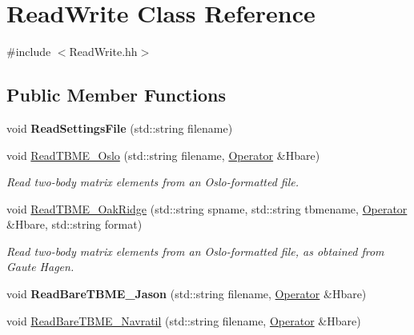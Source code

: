 \hypertarget{classReadWrite}{}\section{Read\+Write Class Reference}
\label{classReadWrite}


{\ttfamily \#include $<$Read\+Write.\+hh$>$}

\subsection*{Public Member Functions}
\begin{DoxyCompactItemize}
\item 
\mbox{\label{classReadWrite_a1b8f22c8f662dd43eec6ce4e62863f3e}} 
void {\bfseries Read\+Settings\+File} (std\+::string filename)
\item 
\mbox{\label{classReadWrite_ae5561ab01c4fc1d3fae3ed155997d826}} 
void \hyperlink{classReadWrite_ae5561ab01c4fc1d3fae3ed155997d826}{Read\+T\+B\+M\+E\+\_\+\+Oslo} (std\+::string filename, \hyperlink{classOperator}{Operator} \&Hbare)
\begin{DoxyCompactList}\small\item\em Read two-\/body matrix elements from an Oslo-\/formatted file. \end{DoxyCompactList}\item 
\mbox{\label{classReadWrite_a2452263af0d93cb400047259c87950b8}} 
void \hyperlink{classReadWrite_a2452263af0d93cb400047259c87950b8}{Read\+T\+B\+M\+E\+\_\+\+Oak\+Ridge} (std\+::string spname, std\+::string tbmename, \hyperlink{classOperator}{Operator} \&Hbare, std\+::string format)
\begin{DoxyCompactList}\small\item\em Read two-\/body matrix elements from an Oslo-\/formatted file, as obtained from Gaute Hagen. \end{DoxyCompactList}\item 
\mbox{\label{classReadWrite_a273740c3bbd9831a59ec8c9e6253340e}} 
void {\bfseries Read\+Bare\+T\+B\+M\+E\+\_\+\+Jason} (std\+::string filename, \hyperlink{classOperator}{Operator} \&Hbare)
\item 
void \hyperlink{classReadWrite_ac69ea7db65be10e8b63a3adf4cf6848d}{Read\+Bare\+T\+B\+M\+E\+\_\+\+Navratil} (std\+::string filename, \hyperlink{classOperator}{Operator} \&Hbare)

\end{DoxyCompactItemize}
